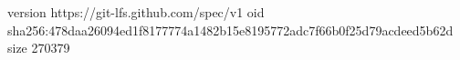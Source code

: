 version https://git-lfs.github.com/spec/v1
oid sha256:478daa26094ed1f8177774a1482b15e8195772adc7f66b0f25d79acdeed5b62d
size 270379
